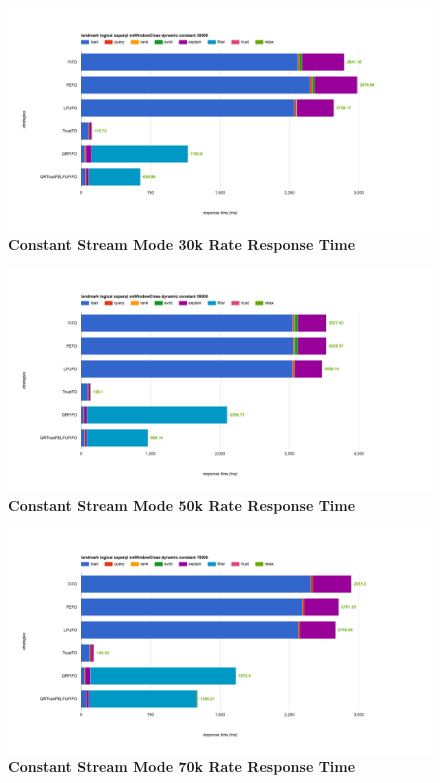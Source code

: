 \begin{figure}[!htbp]
	\centering
    \includegraphics[width=6.5in]{img/6-3wt.png}
    \caption{\textbf{Constant Stream Mode 30k Rate Response Time}}
    \label{fig:6-csmrrt3}
\end{figure}

\begin{figure}[!htbp]
	\centering
    \includegraphics[width=6.5in]{img/6-5wt.png}
    \caption{\textbf{Constant Stream Mode 50k Rate Response Time}}
    \label{fig:6-csmrrt5}
\end{figure}

\begin{figure}[!htbp]
	\centering
    \includegraphics[width=6.5in]{img/6-7wt.png}
    \caption{\textbf{Constant Stream Mode 70k Rate Response Time}}
    \label{fig:6-csmrrt7}
\end{figure}

